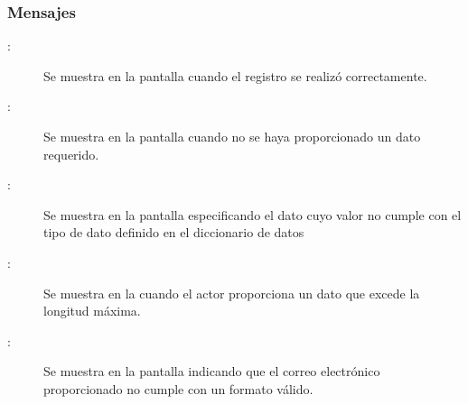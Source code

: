 \subsubsection{Mensajes}
	
\begin{description}
	  \item[:] Se muestra en la pantalla  cuando el registro se realizó correctamente.
	  \item[:] Se muestra en la pantalla  cuando no se haya proporcionado un dato requerido.
	  \item[:] Se muestra en la pantalla  especificando el dato cuyo valor no cumple con el tipo de dato definido en el diccionario de datos
	  \item[:] Se muestra en la  cuando el actor proporciona un dato que excede la longitud máxima.
	  \item[:] Se muestra en la pantalla  indicando que el correo electrónico proporcionado no cumple con un formato válido.

\end{description}
